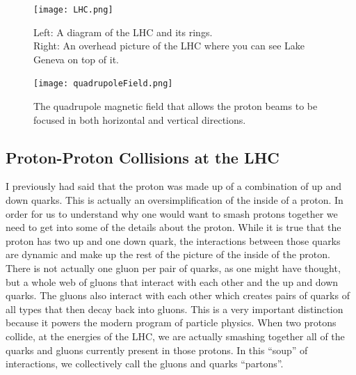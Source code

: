 \begin{figure} %
    \centering
    \texttt{[image: LHC.png]}
    \caption{Left: A diagram of the LHC and its rings.\\ Right: An overhead picture of the LHC where you can see Lake Geneva on top of it.}
    \label{fig:fig_3-1}
 \end{figure}

 \begin{figure} %
    \centering
    \texttt{[image: quadrupoleField.png]}
    \caption{The quadrupole magnetic field that allows the proton beams to be focused in both horizontal and vertical directions.}
    \label{fig:fig_3-2}
 \end{figure}


\subsection{Proton-Proton Collisions at the LHC}
I previously had said that the proton was made up of a combination of up and down quarks. This is actually an oversimplification of the inside of a proton.
In order for us to understand why one would want to smash protons together we need to get into some of the details about the proton.
While it is true that the proton has two up and one down quark, the interactions between those quarks are dynamic and make up the rest of the picture of the inside of the proton.
There is not actually one gluon per pair of quarks, as one might have thought, but a whole web of gluons that interact with each other and the up and down quarks.
The gluons also interact with each other which creates pairs of quarks of all types that then decay back into gluons. 
This is a very important distinction because it powers the modern program of particle physics.
When two protons collide, at the energies of the LHC, we are actually smashing together all of the quarks and gluons currently present in those protons.
In this ``soup'' of interactions, we collectively call the gluons and quarks ``partons''.

